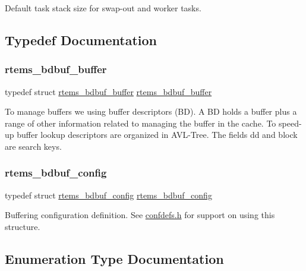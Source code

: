 Default task stack size for swap-\/out and worker tasks. 

\subsection{Typedef Documentation}
\mbox{\label{group__rtems__bdbuf_gacce5a2661bea8023c1b5097f7566f051}} 
\subsubsection{\texorpdfstring{rtems\_bdbuf\_buffer}{rtems\_bdbuf\_buffer}}
{\footnotesize\ttfamily typedef struct \mbox{\hyperlink{structrtems__bdbuf__buffer}{rtems\+\_\+bdbuf\+\_\+buffer}}  \mbox{\hyperlink{structrtems__bdbuf__buffer}{rtems\+\_\+bdbuf\+\_\+buffer}}}

To manage buffers we using buffer descriptors (BD). A BD holds a buffer plus a range of other information related to managing the buffer in the cache. To speed-\/up buffer lookup descriptors are organized in A\+V\+L-\/\+Tree. The fields \textquotesingle{}dd\textquotesingle{} and \textquotesingle{}block\textquotesingle{} are search keys. \mbox{\label{group__rtems__bdbuf_gaf4f5fc331dd33379471c78d5459c69f7}} 
\subsubsection{\texorpdfstring{rtems\_bdbuf\_config}{rtems\_bdbuf\_config}}
{\footnotesize\ttfamily typedef struct \mbox{\hyperlink{structrtems__bdbuf__config}{rtems\+\_\+bdbuf\+\_\+config}}  \mbox{\hyperlink{structrtems__bdbuf__config}{rtems\+\_\+bdbuf\+\_\+config}}}

Buffering configuration definition. See \mbox{\hyperlink{confdefs_8h}{confdefs.\+h}} for support on using this structure. 

\subsection{Enumeration Type Documentation}
\mbox{\label{group__rtems__bdbuf_ga0169f36547d36f0723b6456172eeef0a}} 
